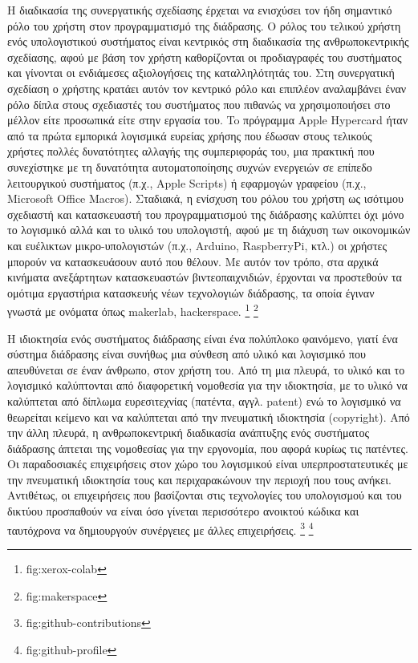 \documentclass[
]{article}
\begin{document}
Η διαδικασία της συνεργατικής σχεδίασης έρχεται να ενισχύσει τον ήδη
σημαντικό ρόλο του χρήστη στον προγραμματισμό της διάδρασης. Ο ρόλος του
τελικού χρήστη ενός υπολογιστικού συστήματος είναι κεντρικός στη
διαδικασία της ανθρωποκεντρικής σχεδίασης, αφού με βάση τον χρήστη
καθορίζονται οι προδιαγραφές του συστήματος και γίνονται οι ενδιάμεσες
αξιολογήσεις της καταλληλότητάς του. Στη συνεργατική σχεδίαση ο χρήστης
κρατάει αυτόν τον κεντρικό ρόλο και επιπλέον αναλαμβάνει έναν ρόλο δίπλα
στους σχεδιαστές του συστήματος που πιθανώς να χρησιμοποιήσει στο μέλλον
είτε προσωπικά είτε στην εργασία του. To πρόγραμμα Apple Hypercard ήταν
από τα πρώτα εμπορικά λογισμικά ευρείας χρήσης που έδωσαν στους τελικούς
χρήστες πολλές δυνατότητες αλλαγής της συμπεριφοράς του, μια πρακτική
που συνεχίστηκε με τη δυνατότητα αυτοματοποίησης συχνών ενεργειών σε
επίπεδο λειτουργικού συστήματος (π.χ., Apple Scripts) ή εφαρμογών
γραφείου (π.χ., Microsoft Office Macros). Σταδιακά, η ενίσχυση του ρόλου
του χρήστη ως ισότιμου σχεδιαστή και κατασκευαστή του προγραμματισμού
της διάδρασης καλύπτει όχι μόνο το λογισμικό αλλά και το υλικό του
υπολογιστή, αφού με τη διάχυση των οικονομικών και ευέλικτων
μικρο-υπολογιστών (π.χ., Arduino, RaspberryPi, κτλ.) οι χρήστες μπορούν
να κατασκευάσουν αυτό που θέλουν. Με αυτόν τον τρόπο, στα αρχικά
κινήματα ανεξάρτητων κατασκευαστών βιντεοπαιχνιδιών, έρχονται να
προστεθούν τα ομότιμα εργαστήρια κατασκευής νέων τεχνολογιών διάδρασης,
τα οποία έγιναν γνωστά με ονόματα όπως makerlab, hackerspace.
\footnote{fig:xerox-colab} \footnote{fig:makerspace}

Η ιδιοκτησία ενός συστήματος διάδρασης είναι ένα πολύπλοκο φαινόμενο,
γιατί ένα σύστημα διάδρασης είναι συνήθως μια σύνθεση από υλικό και
λογισμικό που απευθύνεται σε έναν άνθρωπο, στον χρήστη του. Από τη μια
πλευρά, το υλικό και το λογισμικό καλύπτονται από διαφορετική νομοθεσία
για την ιδιοκτησία, με το υλικό να καλύπτεται από δίπλωμα ευρεσιτεχνίας
(πατέντα, αγγλ. patent) ενώ το λογισμικό να θεωρείται κείμενο και να
καλύπτεται από την πνευματική ιδιοκτησία (copyright). Από την άλλη
πλευρά, η ανθρωποκεντρική διαδικασία ανάπτυξης ενός συστήματος διάδρασης
άπτεται της νομοθεσίας για την εργονομία, που αφορά κυρίως τις πατέντες.
Οι παραδοσιακές επιχειρήσεις στον χώρο του λογισμικού είναι
υπερπροστατευτικές με την πνευματική ιδιοκτησία τους και περιχαρακώνουν
την περιοχή που τους ανήκει. Αντιθέτως, οι επιχειρήσεις που βασίζονται
στις τεχνολογίες του υπολογισμού και του δικτύου προσπαθούν να είναι όσο
γίνεται περισσότερο ανοικτού κώδικα και ταυτόχρονα να δημιουργούν
συνέργειες με άλλες επιχειρήσεις. \footnote{fig:github-contributions}
\footnote{fig:github-profile}
\end{document}
